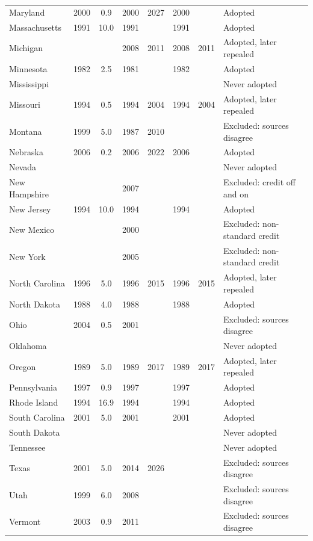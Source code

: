 \begin{longtable}{lccccccl}
Maryland & 2000 & 0.9 & 2000 & 2027 & 2000 &  & Adopted \\
Massachusetts & 1991 & 10.0 & 1991 &  & 1991 &  & Adopted \\
Michigan &  &  & 2008 & 2011 & 2008 & 2011 & Adopted, later repealed \\
Minnesota & 1982 & 2.5 & 1981 &  & 1982 &  & Adopted \\
Mississippi &  &  &  &  &  &  & Never adopted \\
Missouri & 1994 & 0.5 & 1994 & 2004 & 1994 & 2004 & Adopted, later repealed \\
Montana & 1999 & 5.0 & 1987 & 2010 &  &  & Excluded: sources disagree \\
Nebraska & 2006 & 0.2 & 2006 & 2022 & 2006 &  & Adopted \\
Nevada &  &  &  &  &  &  & Never adopted \\
New Hampshire &  &  & 2007 &  &  &  & Excluded: credit off and on \\
New Jersey & 1994 & 10.0 & 1994 &  & 1994 &  & Adopted \\
New Mexico &  &  & 2000 &  &  &  & Excluded: non-standard credit \\
New York &  &  & 2005 &  &  &  & Excluded: non-standard credit \\
North Carolina & 1996 & 5.0 & 1996 & 2015 & 1996 & 2015 & Adopted, later repealed \\
North Dakota & 1988 & 4.0 & 1988 &  & 1988 &  & Adopted \\
Ohio & 2004 & 0.5 & 2001 &  &  &  & Excluded: sources disagree \\
Oklahoma &  &  &  &  &  &  & Never adopted \\
Oregon & 1989 & 5.0 & 1989 & 2017 & 1989 & 2017 & Adopted, later repealed \\
Pennsylvania & 1997 & 0.9 & 1997 &  & 1997 &  & Adopted \\
Rhode Island & 1994 & 16.9 & 1994 &  & 1994 &  & Adopted \\
South Carolina & 2001 & 5.0 & 2001 &  & 2001 &  & Adopted \\
South Dakota &  &  &  &  &  &  & Never adopted \\
Tennessee &  &  &  &  &  &  & Never adopted \\
Texas & 2001 & 5.0 & 2014 & 2026 &  &  & Excluded: sources disagree \\
Utah & 1999 & 6.0 & 2008 &  &  &  & Excluded: sources disagree \\
Vermont & 2003 & 0.9 & 2011 &  &  &  & Excluded: sources disagree \\

\end{longtable}
